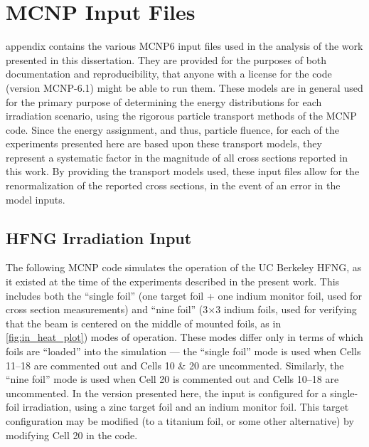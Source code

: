 \appendix
\chapter{MCNP Input Files}

 appendix contains the various MCNP6 input files used in the analysis of the work presented in this dissertation. 
They are provided for the purposes of both documentation and reproducibility, that anyone with a license for the code (version MCNP-6.1) might be able to run them.
These models are in general used for the primary purpose of determining the energy distributions for each irradiation scenario, using the rigorous particle transport methods of the MCNP code.
Since the energy assignment, and thus, particle fluence, for each of the experiments presented here are based upon these transport models, they represent a systematic factor in the magnitude of all cross sections reported in this work.
By providing the transport models used, these input files allow for the renormalization of the reported cross sections, in the event of an error in the model inputs.



\section{HFNG Irradiation Input} \label{sec:hfng_mcnp_deck}

The following MCNP code simulates the operation of the UC Berkeley HFNG, as it existed at the time of the experiments described in the present work.
This includes both the \enquote{single foil}  (one target foil + one indium monitor foil, used for cross section measurements) and \enquote{nine foil} (3$\times$3 indium foils, used for verifying  that the beam is centered on the middle of mounted foils, as in  \autoref{fig:in_heat_plot}) modes of operation.
These modes differ only in terms of which foils are \enquote{loaded} into the simulation --- the \enquote{single foil} mode is used when Cells 11--18 are commented out and Cells 10 \& 20 are uncommented.
Similarly,  the \enquote{nine foil} mode is used when Cell 20 is commented out and Cells 10--18 are uncommented.
In the version presented here, the input is configured for a single-foil irradiation, using a zinc target foil and an indium monitor foil.
This target configuration may be modified (to a titanium  foil, or some other alternative) by modifying Cell 20 in the code.


